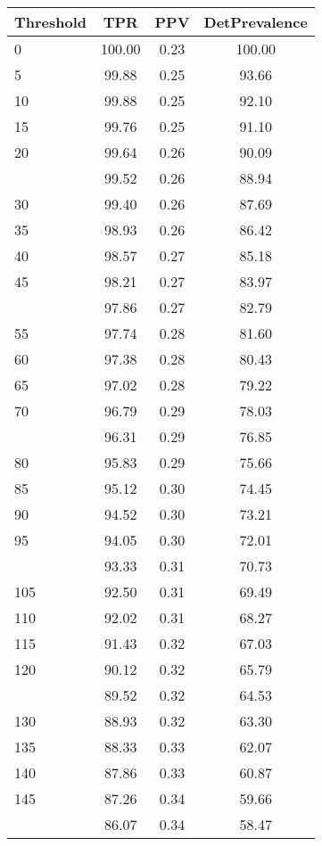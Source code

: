 \begin{table}[ht]
\centering
\begin{tabular}{lccc}
  \toprule
Threshold & TPR & PPV & DetPrevalence \\ 
  \midrule
0 & 100.00 & 0.23 & 100.00 \\ 
  5 & 99.88 & 0.25 & 93.66 \\ 
  10 & 99.88 & 0.25 & 92.10 \\ 
  15 & 99.76 & 0.25 & 91.10 \\ 
  20 & 99.64 & 0.26 & 90.09 \\ 
   \addlinespace
25 & 99.52 & 0.26 & 88.94 \\ 
  30 & 99.40 & 0.26 & 87.69 \\ 
  35 & 98.93 & 0.26 & 86.42 \\ 
  40 & 98.57 & 0.27 & 85.18 \\ 
  45 & 98.21 & 0.27 & 83.97 \\ 
   \addlinespace
50 & 97.86 & 0.27 & 82.79 \\ 
  55 & 97.74 & 0.28 & 81.60 \\ 
  60 & 97.38 & 0.28 & 80.43 \\ 
  65 & 97.02 & 0.28 & 79.22 \\ 
  70 & 96.79 & 0.29 & 78.03 \\ 
   \addlinespace
75 & 96.31 & 0.29 & 76.85 \\ 
  80 & 95.83 & 0.29 & 75.66 \\ 
  85 & 95.12 & 0.30 & 74.45 \\ 
  90 & 94.52 & 0.30 & 73.21 \\ 
  95 & 94.05 & 0.30 & 72.01 \\ 
   \addlinespace
100 & 93.33 & 0.31 & 70.73 \\ 
  105 & 92.50 & 0.31 & 69.49 \\ 
  110 & 92.02 & 0.31 & 68.27 \\ 
  115 & 91.43 & 0.32 & 67.03 \\ 
  120 & 90.12 & 0.32 & 65.79 \\ 
   \addlinespace
125 & 89.52 & 0.32 & 64.53 \\ 
  130 & 88.93 & 0.32 & 63.30 \\ 
  135 & 88.33 & 0.33 & 62.07 \\ 
  140 & 87.86 & 0.33 & 60.87 \\ 
  145 & 87.26 & 0.34 & 59.66 \\ 
   \addlinespace
150 & 86.07 & 0.34 & 58.47 \\ 

\end{tabular}
\end{table}
